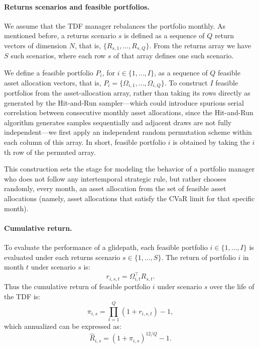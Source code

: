 \documentclass[11pt]{article}
\begin{document}
\paragraph{Returns scenarios and feasible portfolios.}
We assume that the TDF manager rebalances the portfolio monthly. As mentioned before, a returns scenario $s$   is defined as a sequence of $Q$ return vectors of dimension $N$, that is, $\{R_{s,1},\ldots,R_{s,Q}\}$. From the returns array we have $S$ such scenarios, where each row $s$ of that array defines one such scenario.

We define a feasible portfolio $P_i$, for $i \in \{1,\ldots,I\}$, as a sequence of $Q$ feasible asset allocation vectors, that is, $P_i=\{\Omega_{i,1},\ldots,\Omega_{i,Q}\}$. To construct $I$ feasible portfolios from the asset-allocation array, rather than taking its rows directly as generated by the Hit-and-Run sampler---which could introduce spurious serial correlation between consecutive monthly asset allocations, since the Hit-and-Run algorithm generates samples sequentially and adjacent draws are not fully independent---we first apply an independent random permutation scheme within each column of this array. In short, feasible portfolio $i$ is obtained by taking the $i$th row of the  permuted array.

This construction sets the stage for modeling the behavior of a portfolio manager who does not follow any  intertemporal strategic rule, but rather  chooses randomly, every month, an asset allocation from the set of feasible asset allocations (namely, asset allocations that satisfy the CVaR limit for that specific month).

\paragraph{Cumulative return.}
To evaluate the performance of a glidepath, each feasible portfolio $i \in \{1,\ldots,I\}$ is evaluated under each returns scenario $s \in \{1,\ldots,S\}$. The return of portfolio $i$ in month $t$ under scenario $s$ is:
\begin{equation}
r_{i,s,t} = \Omega_{i,t}^{\top}R_{s,t}.
\end{equation}
Thus the cumulative return of feasible portfolio $i$ under scenario $s$ over the life of the TDF is:
\begin{equation}
\pi_{i,s} = \prod_{t=1}^{Q}\left(1+r_{i,s,t}\right)-1,
\end{equation}
which annualized can be expressed as:
\begin{equation}
\widehat{R}_{i,s} = \left(1+\pi_{i,s}\right)^{12/Q}-1.
\end{equation}
\end{document}
